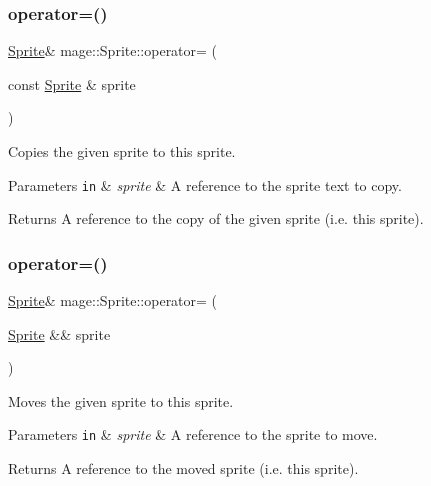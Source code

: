 \subsubsection{\texorpdfstring{operator=()}{operator=()}\hspace{0.1cm}{\footnotesize\ttfamily [1/2]}}
{\footnotesize\ttfamily \hyperlink{classmage_1_1_sprite}{Sprite}\& mage\+::\+Sprite\+::operator= (\begin{DoxyParamCaption}\item[{const \hyperlink{classmage_1_1_sprite}{Sprite} \&}]{sprite }\end{DoxyParamCaption})\hspace{0.3cm}{\ttfamily [delete]}}

Copies the given sprite to this sprite.


\begin{DoxyParams}[1]{Parameters}
\mbox{\tt in}  & {\em sprite} & A reference to the sprite text to copy. \\
\hline
\end{DoxyParams}
\begin{DoxyReturn}{Returns}
A reference to the copy of the given sprite (i.\+e. this sprite). 
\end{DoxyReturn}
\hypertarget{classmage_1_1_sprite_a808d87aeb6d652f9a53e967a75a1eede}{}\label{classmage_1_1_sprite_a808d87aeb6d652f9a53e967a75a1eede} 
\subsubsection{\texorpdfstring{operator=()}{operator=()}\hspace{0.1cm}{\footnotesize\ttfamily [2/2]}}
{\footnotesize\ttfamily \hyperlink{classmage_1_1_sprite}{Sprite}\& mage\+::\+Sprite\+::operator= (\begin{DoxyParamCaption}\item[{\hyperlink{classmage_1_1_sprite}{Sprite} \&\&}]{sprite }\end{DoxyParamCaption})\hspace{0.3cm}{\ttfamily [delete]}}

Moves the given sprite to this sprite.


\begin{DoxyParams}[1]{Parameters}
\mbox{\tt in}  & {\em sprite} & A reference to the sprite to move. \\
\hline
\end{DoxyParams}
\begin{DoxyReturn}{Returns}
A reference to the moved sprite (i.\+e. this sprite). 
\end{DoxyReturn}
\hypertarget{classmage_1_1_sprite_abeefc8ed41e55924be83ba7b480aa40e}{}\label{classmage_1_1_sprite_abeefc8ed41e55924be83ba7b480aa40e} 
